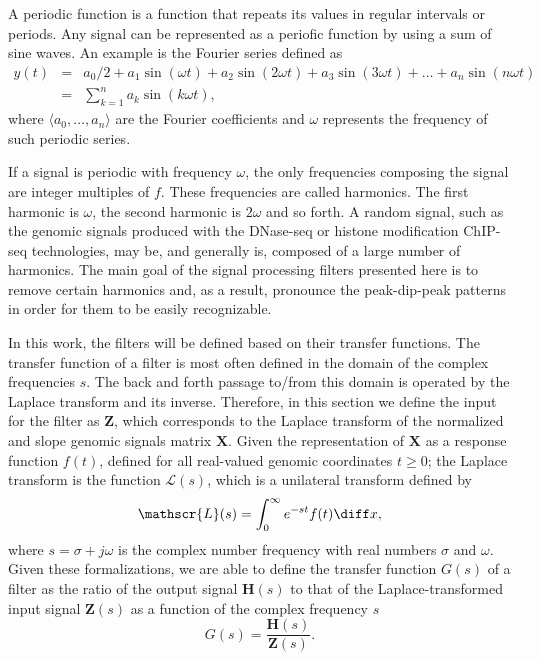 A periodic function is a function that repeats its values in regular intervals or periods. Any signal can be represented as a periofic function by using a sum of sine waves. An example is the Fourier series defined as
\begin{equation}
  \label{eq:fourrier}
  \begin{array}{lcl} 
    y(t) & = & a_0 / 2 + a_1 \sin(\omega t) + a_2 \sin(2 \omega t) + a_3 \sin(3 \omega t) + \dots + a_n \sin(n \omega t) \\
         & = & \sum_{k=1}^n a_k \sin(k \omega t),
  \end{array}
\end{equation}
where $ \langle a_0, \dots, a_n \rangle $ are the Fourier coefficients and $ \omega $ represents the frequency of such periodic series.

If a signal is periodic with frequency $\omega$, the only frequencies composing the signal are integer multiples of $f$. These frequencies are called harmonics. The first harmonic is $\omega$, the second harmonic is $2 \omega$ and so forth. A random signal, such as the genomic signals produced with the DNase-seq or histone modification ChIP-seq technologies, may be, and generally is, composed of a large number of harmonics. The main goal of the signal processing filters presented here is to remove certain harmonics and, as a result, pronounce the peak-dip-peak patterns in order for them to be easily recognizable.

In this work, the filters will be defined based on their transfer functions. The transfer function of a filter is most often defined in the domain of the complex frequencies $ s $. The back and forth passage to/from this domain is operated by the Laplace transform and its inverse. Therefore, in this section we define the input for the filter as $ \mathbf{Z} $, which corresponds to the Laplace transform of the normalized and slope genomic signals matrix $\mathbf{X}$. Given the representation of $\mathbf{X}$ as a response function $f(t)$, defined for all real-valued genomic coordinates $t \geq 0 $; the Laplace transform is the function $\mathscr{L}(s)$, which is a unilateral transform defined by
\begin{equation}
  \label{eq:laplace}
  \mathscr{L}(s) = \int_{0}^\infty e^{-st} f(t) \diff x,
\end{equation}
where $ s = \sigma + j \omega $ is the complex number frequency with real numbers $ \sigma $ and $ \omega $. Given these formalizations, we are able to define the transfer function $G(s)$ of a filter as the ratio of the output signal $ \mathbf{H}(s) $ to that of the Laplace-transformed input signal $ \mathbf{Z}(s) $ as a function of the complex frequency $s$
\begin{equation}
  \label{eq:transfer}
  G(s) = \frac{\mathbf{H}(s)}{\mathbf{Z}(s)}.
\end{equation}

